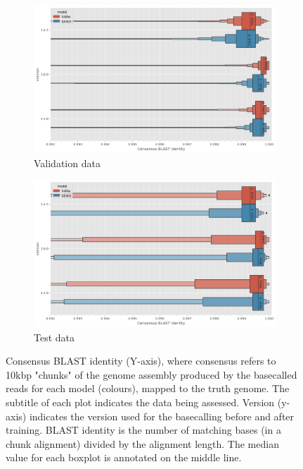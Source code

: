 \begin{figure}
     \centering
     \begin{subfigure}[b]{0.9\textwidth}
        \includegraphics[width=1\linewidth]{Chapter4/Figs/eval_consensus_blast_identity.png}
        \centering
        \caption{Validation data}
        \label{fig:eval-consensus-blast}
     \end{subfigure}
     \hfill
     \begin{subfigure}[b]{0.9\textwidth}
         \centering
        \includegraphics[width=1\linewidth]{Chapter4/Figs/test_consensus_blast_identity.png}
         \caption{Test data}
         \label{fig:test-consensus-blast}
     \end{subfigure}
        \caption{Consensus BLAST identity (Y-axis), where consensus refers to 10kbp "chunks" of the genome assembly produced by the basecalled reads for each model (colours), mapped to the truth genome. The subtitle of each plot indicates the data being assessed. Version (y-axis) indicates the \guppy{} version used for the basecalling before and after training. BLAST identity is the number of matching bases (in a chunk alignment) divided by the alignment length. The median value for each boxplot is annotated on the middle line.}
        \label{fig:consensus-blast}
\end{figure}

